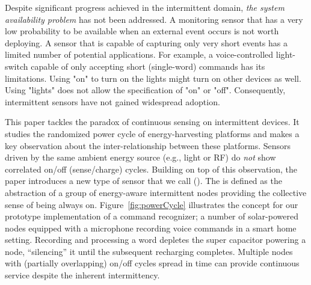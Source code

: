 Despite significant progress achieved in the intermittent domain, \textit{the system availability problem} has not been addressed. A monitoring sensor that has a very low probability to be available when an external event occurs is not worth deploying. A sensor that is capable of capturing only very short events has a limited number of potential applications. 
For example, a voice-controlled light-switch capable of only accepting short (single-word) commands has its limitations. Using "on" to turn on the lights might turn on other devices as well. Using "lights" does not allow the specification of "on" or "off". Consequently, intermittent sensors have not gained widespread adoption.

This paper tackles the paradox of continuous sensing on intermittent devices. It studies the randomized power cycle of energy-harvesting platforms and makes a key observation about the inter-relationship between these platforms. Sensors driven by the same ambient energy source (e.g., light or RF) do {\em not} show correlated on/off (sense/charge) cycles. Building on top of this observation, the paper introduces a new type of sensor that we call \textit{\fullsys} (\sys). The \sys is defined as the abstraction of a group of energy-aware intermittent nodes providing the collective sense of being always on. Figure~\ref{fig:powerCycle} illustrates the \sys concept for our prototype implementation of a command recognizer; a number of solar-powered nodes equipped with a microphone recording voice commands in a smart home setting. Recording and processing a word depletes the super capacitor powering a node, ``silencing'' it until the subsequent recharging completes. Multiple nodes with (partially overlapping) on/off cycles spread in time can provide continuous service despite the inherent intermittency.

